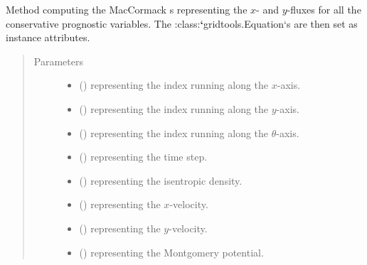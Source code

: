 \documentclass[letterpaper,10pt,english]{sphinxmanual}
\begin{document}
\begin{fulllineitems}
\begin{fulllineitems}
\label{\detokenize{api:dycore.flux_isentropic.FluxIsentropicMacCormack._compute_fluxes}}
Method computing the MacCormack s representing the \(x\)- and \(y\)-fluxes for all
the conservative prognostic variables. The :class:{\color{red}\bfseries{}{}`}gridtools.Equation{}`s are then set as instance attributes.
\begin{quote}\begin{description}
\item[{Parameters}] \leavevmode\begin{itemize}
\item {} 
 () \textendash{}  representing the index running along the \(x\)-axis.

\item {} 
 () \textendash{}  representing the index running along the \(y\)-axis.

\item {} 
 () \textendash{}  representing the index running along the \(\theta\)-axis.

\item {} 
 () \textendash{}  representing the time step.

\item {} 
 () \textendash{}  representing the isentropic density.

\item {} 
 () \textendash{}  representing the \(x\)-velocity.

\item {} 
 () \textendash{}  representing the \(y\)-velocity.

\item {} 
 () \textendash{}  representing the Montgomery potential.


\end{itemize}
\end{description}
\end{quote}
\end{fulllineitems}
\end{fulllineitems}
\end{document}
